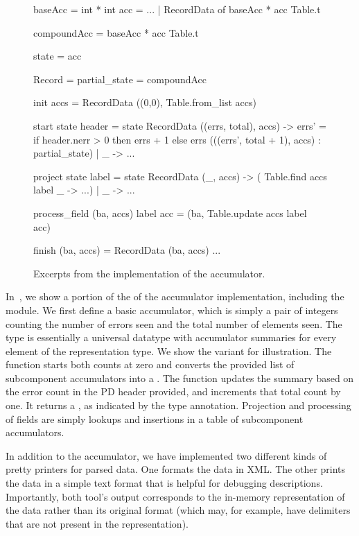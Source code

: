 \begin{figure}
\begin{code}\scriptsize
{} baseAcc = int * int
 acc = ...
| RecordData of baseAcc * acc Table.t

 compoundAcc = baseAcc * acc Table.t

 state = acc

 Record = 
   partial_state = compoundAcc

   init accs = RecordData ((0,0), Table.from_list accs)

   start state header =
     state 
      RecordData ((errs, total), accs) ->
	 errs' = if header.nerr > 0
                    then errs + 1 else errs
	 (((errs', total + 1), accs) : partial_state)
    | _ ->  ...
	  
   project state label = 
      state 
      RecordData (_, accs) -> ( Table.find accs label
                                  _ ->  ...)
    | _ ->  ...

   process_field (ba, accs) label acc =
    (ba, Table.update accs label acc)
      
   finish (ba, accs) = RecordData (ba, accs)
...
\end{code}
\caption{Excerpts from the implementation of the accumulator.}
\label{fig:gentool-accum-code}
\end{figure}

In~, we show a portion of the of the
accumulator implementation, including the  module. We first
define a basic accumulator, which is simply a pair of integers
counting the number of errors seen and the total number of elements
seen. The type  is essentially a universal datatype with
accumulator summaries for every element of the representation type. We
show the  variant for illustration.  The 
function starts both counts at zero and converts the provided list of
subcomponent accumulators into a .  The 
function updates the summary based on the error count  in the
PD header provided, and increments that total count by one. It returns
a , as indicated by the type annotation. Projection
and processing of fields are simply lookups and insertions in a table
of subcomponent accumulators.

In addition to the accumulator, we have implemented two different
kinds of pretty printers for parsed data.  One formats the data in
XML. The other prints the data in a simple text format that is helpful
for debugging descriptions. Importantly, both tool's output corresponds to the in-memory
representation of the data rather than its original format (which may,
for example, have delimiters that are not present in the
representation).

